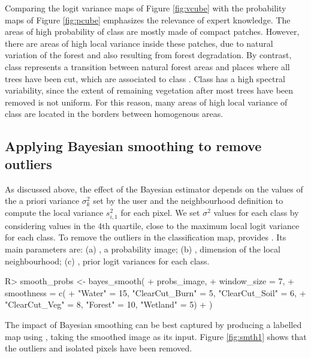 \documentclass[
  shortnames]{jss}
\begin{document}
Comparing the logit variance maps of Figure \ref{fig:vcube} with the probability maps of Figure \ref{fig:pcube} emphasizes the relevance of expert knowledge. The areas of high probability of class  are mostly made of compact patches. However, there are areas of high local variance inside these patches, due to natural variation of the forest and also resulting from forest degradation. By contrast, class  represents a transition between natural forest areas and places where all trees have been cut, which are associated to class . Class  has a high spectral variability, since the extent of remaining vegetation after most trees have been removed is not uniform. For this reason, many areas of high local variance of class  are located in the borders between homogenous areas.

\hypertarget{applying-bayesian-smoothing-to-remove-outliers}{%
\subsection{Applying Bayesian smoothing to remove outliers}\label{applying-bayesian-smoothing-to-remove-outliers}}

As discussed above, the effect of the Bayesian estimator depends on the values of the a priori variance \(\sigma^2_{k}\) set by the user and the neighbourhood definition to compute the local variance \(s^2_{i,1}\) for each pixel. We set \(\sigma^2\) values for each class by considering values in the 4th quartile, close to the maximum local logit variance for each class. To remove the outliers in the classification map,  provides . Its main parameters are: (a) , a probability image; (b) , dimension of the local neighbourhood; (c) , prior logit variances for each class.

\begin{CodeChunk}
\begin{CodeInput}
R> smooth_probs <- bayes_smooth(
+     probs_image,
+     window_size = 7,
+     smoothness = c(
+       "Water" = 15, "ClearCut_Burn" = 5, "ClearCut_Soil" = 6, 
+       "ClearCut_Veg" =  8, "Forest" = 10, "Wetland" = 5)
+ )
\end{CodeInput}
\end{CodeChunk}

The impact of Bayesian smoothing can be best captured by producing a labelled map using , taking the smoothed image as its input. Figure \ref{fig:smth1} shows that the outliers and isolated pixels have been removed.
\end{document}
